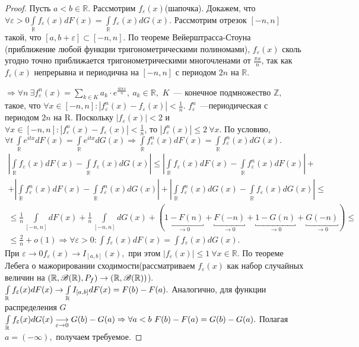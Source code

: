 	\begin{proof}
		Пусть \(a < b \in \mathbb{R}\). Рассмотрим \(f_\varepsilon(x)\)(шапочка). Докажем, что \(\forall \varepsilon > 0 \int\limits_{\mathbb{R}} f_\varepsilon(x) dF(x) = \int\limits_\mathbb{R}f_\varepsilon(x)dG(x).\) Рассмотрим отрезок \([-n, n]\) такой, что \([a, b + \varepsilon] \subset [-n, n].\) По теореме Вейерштрасса-Стоуна (приближение любой функции тригонометрическими полиномами), \(f_\varepsilon(x)\) сколь угодно точно приближается тригонометрическими многочленами от \(\frac{\pi x}{n}\), так как \(f_\varepsilon(x)\) непрерывна и периодична на \([-n, n]\) с периодом \(2n\) на \(\mathbb{R}\).

		\noindent \(\Rightarrow \forall n ~ \exists f_\varepsilon^n(x) = \sum\limits_{k \in K} a_k\cdot e^{\frac{ik\pi x}{n}}, ~a_k \in \mathbb{R},\) \(K\)~--- конечное подмножество \(\mathbb{Z},\) такое, что \(\forall x \in [-n, n]: |f_\varepsilon^n(x) - f_\varepsilon(x)| < \frac{1}{n}.\) \(f_\varepsilon^n\)~---периодическая с периодом \(2n\) на \(\mathrm{R}\). Поскольку \(|f_\varepsilon(x)| < 2\) и \(\forall x \in [-n, n]: |f_\varepsilon^n(x) - f_\varepsilon(x)| < \frac{1}{n}\), то \(|f_\varepsilon^n(x)| \leqslant 2 ~ \forall x.\) По условию, \(\forall t~\int\limits_\mathbb{R} e^{itx}dF(x) = \int\limits_\mathbb{R} e^{itx}dG(x) \Rightarrow \int\limits_\mathbb{R} f_\varepsilon^n(x)dF(x) = \int\limits_\mathbb{R} f_\varepsilon^n(x)dG(x).\)
		\begin{gather*}
			\left|\int\limits_\mathbb{R} f_\varepsilon(x) dF(x) - \int\limits_\mathbb{R} f_\varepsilon(x)dG(x)\right| \leqslant \left|\int\limits_\mathbb{R} f_\varepsilon(x) dF(x) - \int\limits_\mathbb{R} f_\varepsilon^n(x) dF(x)\right| +\\
			+  \left|\int\limits_\mathbb{R} f_\varepsilon^n(x) dF(x) - \int\limits_\mathbb{R} f_\varepsilon^n(x) dG(x)\right| + \left|\int\limits_\mathbb{R} f_\varepsilon^n(x) dG(x) - \int\limits_\mathbb{R} f_\varepsilon(x) dG(x)\right| \leqslant\\
			\leqslant \frac{1}{n} \int\limits_{[-n,n]}dF(x) + \frac{1}{n} \int\limits_{[-n,n]}dG(x) +(\underbracket{1 - F(n)}_{\to 0} + \underbracket{F(-n)}_{\to 0} + \underbracket{1 - G(n)}_{\to 0} + \underbracket{G(-n)}_{\to 0}) \leqslant\\
			\leqslant \frac{2}{n} + o(1) \Rightarrow \forall \varepsilon> 0: \int f_\varepsilon(x) dF(x) = \int f_\varepsilon(x)dG(x).
		\end{gather*}
		При \(\varepsilon \to 0 f_\varepsilon(x) \to I_{[a,b]}(x),\) при этом \(|f_\varepsilon(x)| \leqslant 1~ \forall x \in \mathbb{R}.\) По теореме Лебега о мажорировании сходимости(рассматриваем \(f_\varepsilon(x)\) как набор случайных величин на \((\mathbb{R}, \mathscr{B}(\mathbb{R}), P_f) \to (\mathbb{R}, \mathscr{B}(\mathbb{R}))\)).
		\(\int\limits_{\mathbb{R}} f_\varepsilon(x)dF(x) \to \int\limits_{\mathbb{R}} I_{[a,b]}dF(x) = F(b) - F(a).\)
		Аналогично, для функции распределения \(G\) \(\int\limits_{\mathbb{R}} f_\varepsilon(x)dG(x) \underset{\varepsilon \to 0}{\longrightarrow} G(b) - G(a) \Rightarrow \forall a < b ~ F(b) - F(a) = G(b) - G(a).\)  Полагая \(a = (-\infty), \) получаем требуемое.
	\end{proof}

